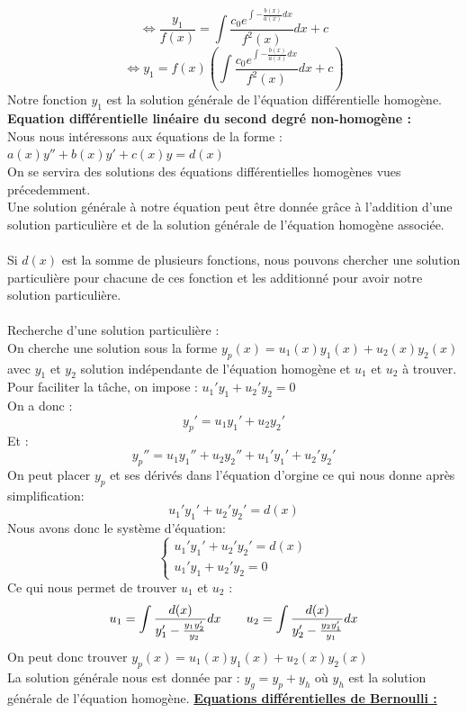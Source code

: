\documentclass[12pt, letterpaper]{article}
\begin{document}
\[
\Leftrightarrow \frac{y_1}{f(x)} = \int \frac{c_0 e^{\int -\frac{b(x)}{a(x)} dx}}{f^2(x)} dx +c
\]
\[
\Leftrightarrow y_1 = f(x) \left(\int \frac{c_0 e^{\int -\frac{b(x)}{a(x)} dx}}{f^2(x)} dx +c\right)
\]
Notre fonction $y_1$ est la solution générale de l'équation différentielle homogène.
\newpage
\noindent \textbf{Equation différentielle linéaire du second degré non-homogène :}
\\
Nous nous intéressons aux équations de la forme : $a(x)y'' + b(x)y' + c(x)y = d(x)$
\\
On se servira des solutions des équations différentielles homogènes vues précedemment.
\\
Une solution générale à notre équation peut être donnée grâce à l'addition d'une solution particulière et de la solution générale de l'équation homogène associée.
\\
\\
Si $d(x)$ est la somme de plusieurs fonctions, nous pouvons chercher une solution particulière pour chacune de ces fonction et les additionné pour avoir notre solution particulière.
\\
\\
Recherche d'une solution particulière :
\\
On cherche une solution sous la forme $y_p(x) = u_1(x)y_1(x) + u_2(x)y_2(x)$ avec $y_1$ et $y_2$ solution indépendante de l'équation homogène et $u_1$ et $u_2$ à trouver.
\\
Pour faciliter la tâche, on impose : $u_1'y_1 + u_2'y_2 = 0$
\\
On a donc :
\[
y_p' = u_1y_1' +u_2y_2'
\]
Et :
\[
y_p'' = u_1y_1'' +u_2y_2'' + u_1'y_1' +u_2'y_2'
\]
On peut placer $y_p$ et ses dérivés dans l'équation d'orgine ce qui nous donne après simplification:
\[
u_1'y_1' + u_2'y_2' = d(x)
\]
Nous avons donc le système d'équation:
\[
\begin{cases}
  u_1'y_1' + u_2'y_2' = d(x) \\
  u_1'y_1 + u_2'y_2 = 0
\end{cases}
\]
Ce qui nous permet de trouver $u_1$ et $u_2$ :
\[
u_1 = \int \frac{d(x)}{y_1' - \frac{y_1y_2'}{y_2}}dx \hspace*{2em} u_2 = \int \frac{d(x)}{y_2' - \frac{y_2y_1'}{y_1}}dx 
\]
On peut donc trouver $y_p(x) = u_1(x)y_1(x) + u_2(x)y_2(x)$
\\
La solution générale nous est donnée par : $y_g = y_p + y_h$ où $y_h$ est la solution générale de l'équation homogène.
%
%
\newpage
\noindent \textbf{\underline{Equations différentielles de Bernoulli :}}
\end{document}
